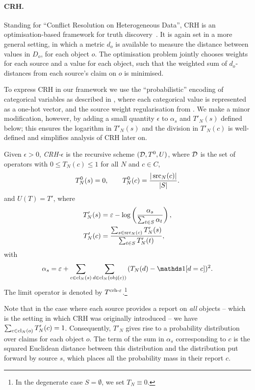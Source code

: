 \paragraph{CRH.} Standing for ``Conflict Resolution on Heterogeneous Data'', CRH
is an optimisation-based framework for truth discovery~\cite{li2016}. It is
again set in a more general setting, in which a metric $d_o$ is available to
measure the distance between values in $D_o$, for each object $o$. The
optimisation problem jointly chooses weights for each source and a value for
each object, such that the weighted sum of $d_o$-distances from each source's
claim on $o$ is minimised.

To express CRH in our framework we use the ``probabilistic'' encoding of
categorical variables as described in \cite[]{li2016},
where each categorical value is represented as a one-hot vector, and the source
weight regularisation from \cite[Eq. (4)]{li2016}. We make a minor
modification, however, by adding a small quantity $\epsilon$ to $\alpha_s$ and
$T'_N(s)$ defined below; this ensures the logarithm in $T'_N(s)$ and the
division in $T'_N(c)$ is well-defined and simplifies analysis of CRH later on.

\begin{definition}
    \label{td_new_def_crh}
    Given $\epsilon > 0$, \emph{CRH-$\epsilon$} is the recursive scheme $(\mathcal{D},
    T^0, U)$, where $\mathcal{D}$ is the set of operators with $0 \le T_N(c) \le 1$ for
    all $N$ and $c \in C$,
    \[
        T^0_N(s) = 0, \qquad
        T^0_N(c) = \frac{|\operatorname{src}_N(c)|}{|S|}.
    \]
    and $U(T) = T'$, where
    \begin{align*}
        T'_N(s) &= \varepsilon - \log\left(\frac{\alpha_s}{\sum_{t \in S}{\alpha_t}}\right), \\
        T'_N(c) &=
            \frac{\sum_{s \in \operatorname{src}_N(c)}{T'_N(s)}}{\sum_{t \in S}{T'_N(t)}},
    \end{align*}
    with
    \[
        \alpha_s = \epsilon + \sum_{c \in \claims_N(s)}{
            \sum_{d \in \claims_N(\obj(c))}{
                (T_N(d) - \indicator{d = c})^2
            }
        }.
    \]
    The limit operator is denoted by $T^{\operatorname{crh-{\varepsilon}}}$.\footnote{In the
    degenerate case $S = \emptyset$, we set $T_N \equiv 0$.}
\end{definition}

Note that in the case where each source provides a report on \emph{all} objects
-- which is the setting in which CRH was originally introduced -- we have
$\sum_{c \in \operatorname{cl}_N(o)}{T'_N(c)} = 1$. Consequently, $T'_N$ gives rise to a
probability distribution over claims for each object $o$. The term of the sum
in $\alpha_s$ corresponding to $c$ is the squared Euclidean distance between
this distribution and the distribution put forward by source $s$, which places
all the probability mass in their report $c$.

